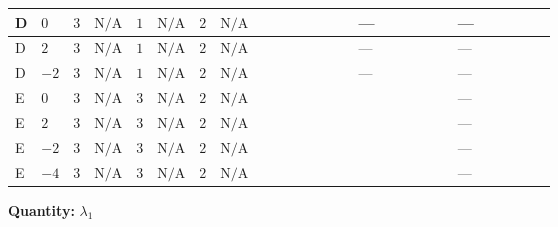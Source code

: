 \documentclass[8pt]{article}
\begin{document}
\begin{landscape}
\begin{longtable}{@{}llcccccc >{\raggedright\arraybackslash}p{0.21\linewidth} >{\raggedright\arraybackslash}p{0.21\linewidth} >{\raggedright\arraybackslash}p{0.21\linewidth}@{}}
\midrule
D & $0$ & $3$ & $\text{N/A}$ & $1$ & $\text{N/A}$ & $2$ & $\text{N/A}$ & \scriptsize\adjustbox{max width=\linewidth}{$\begin{gathered} +2 {\lambda_{HS_2}^{(1)}}^2\end{gathered}$} & --- & --- \\
\midrule
D & $2$ & $3$ & $\text{N/A}$ & $1$ & $\text{N/A}$ & $2$ & $\text{N/A}$ & \scriptsize\adjustbox{max width=\linewidth}{$\begin{gathered} +2 {\lambda_{HS_2}^{(1)}}^2\end{gathered}$} & --- & --- \\
\midrule
D & $-2$ & $3$ & $\text{N/A}$ & $1$ & $\text{N/A}$ & $2$ & $\text{N/A}$ & \scriptsize\adjustbox{max width=\linewidth}{$\begin{gathered} +2 {\lambda_{HS_2}^{(1)}}^2\end{gathered}$} & --- & --- \\
\midrule
E & $0$ & $3$ & $\text{N/A}$ & $3$ & $\text{N/A}$ & $2$ & $\text{N/A}$ & \scriptsize\adjustbox{max width=\linewidth}{$\begin{gathered} +6 {\lambda_{HS_2}^{(1)}}^2\end{gathered}$} & \scriptsize\adjustbox{max width=\linewidth}{$\begin{gathered} +3 {\lambda_{HS_2}^{(A)}}^2\end{gathered}$} & --- \\
\midrule
E & $2$ & $3$ & $\text{N/A}$ & $3$ & $\text{N/A}$ & $2$ & $\text{N/A}$ & \scriptsize\adjustbox{max width=\linewidth}{$\begin{gathered} +6 {\lambda_{HS_2}^{(1)}}^2\end{gathered}$} & \scriptsize\adjustbox{max width=\linewidth}{$\begin{gathered} +3 {\lambda_{HS_2}^{(A)}}^2\end{gathered}$} & --- \\
\midrule
E & $-2$ & $3$ & $\text{N/A}$ & $3$ & $\text{N/A}$ & $2$ & $\text{N/A}$ & \scriptsize\adjustbox{max width=\linewidth}{$\begin{gathered} +6 {\lambda_{HS_2}^{(1)}}^2\end{gathered}$} & \scriptsize\adjustbox{max width=\linewidth}{$\begin{gathered} +3 {\lambda_{HS_2}^{(A)}}^2\end{gathered}$} & --- \\
\midrule
E & $-4$ & $3$ & $\text{N/A}$ & $3$ & $\text{N/A}$ & $2$ & $\text{N/A}$ & \scriptsize\adjustbox{max width=\linewidth}{$\begin{gathered} +6 {\lambda_{HS_2}^{(1)}}^2\end{gathered}$} & \scriptsize\adjustbox{max width=\linewidth}{$\begin{gathered} +3 {\lambda_{HS_2}^{(A)}}^2\end{gathered}$} & --- \\
\midrule
\bottomrule
\end{longtable}
\clearpage
\noindent\textbf{Quantity: }$\lambda_1$\par\smallskip

\end{landscape}
\end{document}
